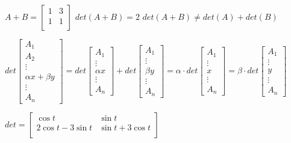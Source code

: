 \documentclass{article}
\begin{document}
$A + B = \begin{bmatrix}
    1 & 3 \\
    1 & 1 \\
\end{bmatrix}$
\bigbreak $det (A + B) = 2$
\bigbreak $det (A + B) \neq det(A) + det(B)$

\bigbreak

$det \begin{bmatrix}
    A_1 \\
    A_2 \\
    \vdots \\
    \alpha x + \beta y \\
    \vdots \\
    A_n
\end{bmatrix} = det \begin{bmatrix}
    A_1 \\
    \vdots \\
    \alpha x \\
    \vdots \\
    A_n
\end{bmatrix} + det \begin{bmatrix}
    A_1 \\
    \vdots \\
    \beta y \\
    \vdots \\
    A_n
\end{bmatrix} = \alpha \cdot det \begin{bmatrix}
    A_1 \\
    \vdots \\
    x\\
    \vdots \\
    A_n
\end{bmatrix} = \beta \cdot det \begin{bmatrix}
    A_1 \\
    \vdots \\
    y\\
    \vdots \\
    A_n
\end{bmatrix}$

\bigbreak

$det = \begin{bmatrix}
    \cos t & \sin t \\
    2\cos t -3 \sin t & \sin t + 3 \cos t\\
\end{bmatrix}$

\bigbreak
 
\end{document}

